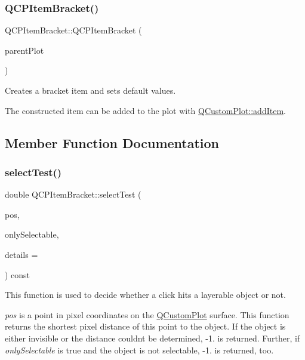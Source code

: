 \subsubsection{\texorpdfstring{Q\+C\+P\+Item\+Bracket()}{QCPItemBracket()}}
{\footnotesize\ttfamily Q\+C\+P\+Item\+Bracket\+::\+Q\+C\+P\+Item\+Bracket (\begin{DoxyParamCaption}\item[{\mbox{\hyperlink{class_q_custom_plot}{Q\+Custom\+Plot}} $\ast$}]{parent\+Plot }\end{DoxyParamCaption})}

Creates a bracket item and sets default values.

The constructed item can be added to the plot with \mbox{\hyperlink{class_q_custom_plot_aa500620379262321685cb7a7674cbd2a}{Q\+Custom\+Plot\+::add\+Item}}. 

\subsection{Member Function Documentation}
\mbox{\label{class_q_c_p_item_bracket_a971299aa6fef75730d6f10efdaf48616}} 
\subsubsection{\texorpdfstring{select\+Test()}{selectTest()}}
{\footnotesize\ttfamily double Q\+C\+P\+Item\+Bracket\+::select\+Test (\begin{DoxyParamCaption}\item[{const Q\+PointF \&}]{pos,  }\item[{bool}]{only\+Selectable,  }\item[{Q\+Variant $\ast$}]{details = {} }\end{DoxyParamCaption}) const\hspace{0.3cm}{\ttfamily [virtual]}}

This function is used to decide whether a click hits a layerable object or not.

{\itshape pos} is a point in pixel coordinates on the \mbox{\hyperlink{class_q_custom_plot}{Q\+Custom\+Plot}} surface. This function returns the shortest pixel distance of this point to the object. If the object is either invisible or the distance couldn\textquotesingle{}t be determined, -\/1. is returned. Further, if {\itshape only\+Selectable} is true and the object is not selectable, -\/1. is returned, too.

